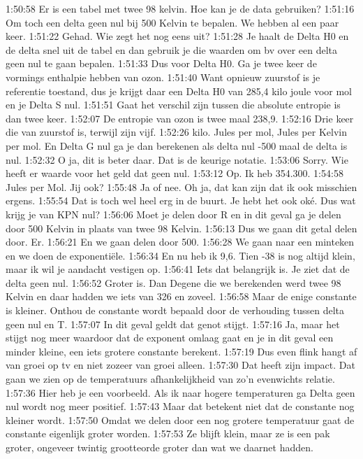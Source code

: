 1:50:58
Er is een tabel met twee 98 kelvin. Hoe kan je de data gebruiken?
1:51:16
Om toch een delta geen nul bij 500 Kelvin te bepalen. We hebben al een paar keer.
1:51:22
Gehad. Wie zegt het nog eens uit?
1:51:28
Je haalt de Delta H0 en de delta snel uit de tabel en dan gebruik je die waarden om bv over een delta geen nul te gaan bepalen.
1:51:33
Dus voor Delta H0. Ga je twee keer de vormings enthalpie hebben van ozon.
1:51:40
Want opnieuw zuurstof is je referentie toestand, dus je krijgt daar een Delta H0 van 285,4 kilo joule voor mol en je Delta S nul.
1:51:51
Gaat het verschil zijn tussen die absolute entropie is dan twee keer.
1:52:07
De entropie van ozon is twee maal 238,9.
1:52:16
Drie keer die van zuurstof is, terwijl zijn vijf.
1:52:26
kilo. Jules per mol, Jules per Kelvin per mol. En Delta G nul ga je dan berekenen als delta nul -500 maal de delta is nul.
1:52:32
O ja, dit is beter daar. Dat is de keurige notatie.
1:53:06
Sorry. Wie heeft er waarde voor het geld dat geen nul.
1:53:12
Op. Ik heb 354.300.
1:54:58
Jules per Mol. Jij ook?
1:55:48
Ja of nee. Oh ja, dat kan zijn dat ik ook misschien ergens.
1:55:54
Dat is toch wel heel erg in de buurt. Je hebt het ook oké. Dus wat krijg je van KPN nul?
1:56:06
Moet je delen door R en in dit geval ga je delen door 500 Kelvin in plaats van twee 98 Kelvin.
1:56:13
Dus we gaan dit getal delen door. Er.
1:56:21
En we gaan delen door 500.
1:56:28
We gaan naar een minteken en we doen de exponentiële.
1:56:34
En nu heb ik 9,6. Tien -38 is nog altijd klein, maar ik wil je aandacht vestigen op.
1:56:41
Iets dat belangrijk is. Je ziet dat de delta geen nul.
1:56:52
Groter is. Dan Degene die we berekenden werd twee 98 Kelvin en daar hadden we iets van 326 en zoveel.
1:56:58
Maar de enige constante is kleiner. Onthou de constante wordt bepaald door de verhouding tussen delta geen nul en T.
1:57:07
In dit geval geldt dat genot stijgt.
1:57:16
Ja, maar het stijgt nog meer waardoor dat de exponent omlaag gaat en je in dit geval een minder kleine, een iets grotere constante berekent.
1:57:19
Dus even flink hangt af van groei op tv en niet zozeer van groei alleen.
1:57:30
Dat heeft zijn impact. Dat gaan we zien op de temperatuurs afhankelijkheid van zo'n evenwichts relatie.
1:57:36
Hier heb je een voorbeeld. Als ik naar hogere temperaturen ga Delta geen nul wordt nog meer positief.
1:57:43
Maar dat betekent niet dat de constante nog kleiner wordt.
1:57:50
Omdat we delen door een nog grotere temperatuur gaat de constante eigenlijk groter worden.
1:57:53
Ze blijft klein, maar ze is een pak groter, ongeveer twintig grootteorde groter dan wat we daarnet hadden.

